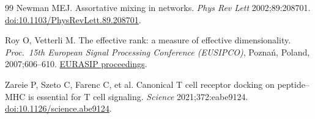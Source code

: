 \documentclass[11pt,a4paper]{article}
\begin{document}
\begin{thebibliography}{99}
 Newman MEJ. Assortative mixing in networks.
\textit{Phys Rev Lett} 2002;89:208701.
\href{https://doi.org/10.1103/PhysRevLett.89.208701}{doi:10.1103/PhysRevLett.89.208701}.

 Roy O, Vetterli M. The effective rank: a measure of effective
dimensionality. \textit{Proc.\ 15th European Signal Processing Conference (EUSIPCO)},
Pozna\'{n}, Poland, 2007;606--610.
\href{https://www.eurasip.org/Proceedings/Eusipco/Eusipco2007/Papers/a5p-h05.pdf}{EURASIP
proceedings}.

 Zareie P, Szeto C, Farenc C, et al. Canonical T cell receptor docking on
peptide--MHC is essential for T cell signaling. \textit{Science} 2021;372:eabe9124.
\href{https://doi.org/10.1126/science.abe9124}{doi:10.1126/science.abe9124}.

\end{thebibliography}
\end{document}
